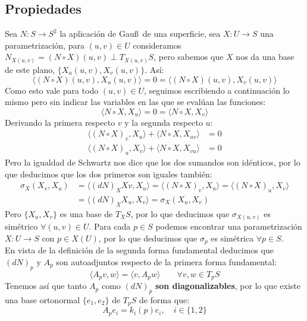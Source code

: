 \subsection{Propiedades}
\noindent
Sea $N:S\to S^2$ la aplicación de Gau\ss\ de una superficie, sea $X:U\to S$ una parametrización, para $(u,v)\in U$ consideramos $N_{X(u,v)} = (N\circ X)(u,v)\perp T_{X(u,v)}S$, pero sabemos que $X$ nos da una base de este plano, $\{X_u(u,v),X_v(u,v)\}$. Así:
\begin{equation*}
    \langle (N\circ X)(u,v),X_u(u,v) \rangle  = 0 = \langle (N\circ X)(u,v),X_v(u,v) \rangle  
\end{equation*}
Como esto vale para todo $(u,v)\in U$, seguimos escribiendo a continuación lo mismo pero sin indicar las variables en las que se evalúan las funciones:
\begin{equation*}
    \langle N\circ X, X_u \rangle  = 0 = \langle N\circ X, X_v \rangle 
\end{equation*}
Derivando la primera respecto $v$ y la segunda respecto $u$:
\begin{align*}
    \langle (N\circ X)_v,X_u \rangle  + \langle N\circ X,X_{uv} \rangle  &= 0 \\
    \langle (N\circ X)_u,X_v \rangle + \langle N\circ X, X_{vu} \rangle  &= 0
\end{align*}
Pero la igualdad de Schwartz nos dice que los dos sumandos son idénticos, por lo que deducimos que los dos primeros son iguales también:
\begin{align*}
    \sigma_X(X_v,X_u) &= \langle (dN)_XXv,X_u \rangle = \langle (N\circ X)_v,X_u \rangle  = \langle (N\circ X)_u,X_v \rangle \\ &= \langle (dN)_XX_u, X_v \rangle = \sigma_X(X_u,X_v)
\end{align*}
Pero $\{X_u,X_v\}$ es una base de $T_XS$, por lo que deducimos que $\sigma_{X(u,v)}$ es simétrico $\forall (u,v)\in U$. Para cada $p\in S$ podemos encontrar una parametrización $X:U\to S$ con $p\in X(U)$, por lo que deducimos que $\sigma_p$ es simétrica $\forall p\in S$.\\

\noindent
En vista de la definición de la segunda forma fundamental deducimos que $(dN)_p$ y $A_p$ son autoadjuntos respecto de la primera forma fundamental:
\begin{equation*}
    \langle A_pv,w \rangle = \langle v,A_pw \rangle  \qquad \forall v,w\in T_pS
\end{equation*}
Tenemos así que tanto $A_p$ como $(dN)_p$ \textbf{son diagonalizables}, por lo que existe una base ortonormal $\{e_1,e_2\}$ de $T_pS$ de forma que:
\begin{equation*}
    A_pe_i = k_i(p)e_i, \quad i \in \{1,2\}
\end{equation*}

